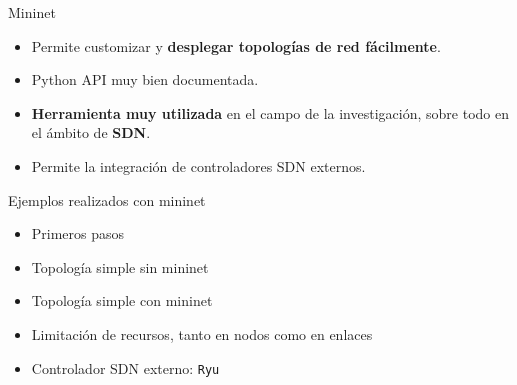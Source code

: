 \documentclass[aspectratio=169,xcolor=dvipsnames]{beamer}
\begin{document}
	\begin{frame}{Mininet}
	    \begin{itemize}
	        \item Permite customizar y \textbf{desplegar topologías de red fácilmente}.
	        \item Python API muy bien documentada.
	        \item \textbf{Herramienta muy utilizada} en el campo de la investigación, sobre todo en el ámbito de \textbf{SDN}.
	        \item Permite la integración de controladores SDN externos.
	    \end{itemize}
	
	    \begin{alertblock}{Ejemplos realizados con mininet}
	        \begin{itemize}
	            \item Primeros pasos
	            \item Topología simple sin mininet
	            \item Topología simple con mininet
	            \item Limitación de recursos, tanto en nodos como en enlaces
	            \item Controlador SDN externo: \texttt{Ryu}
	        \end{itemize}
	    \end{alertblock}
	\end{frame}
	
\end{document}
